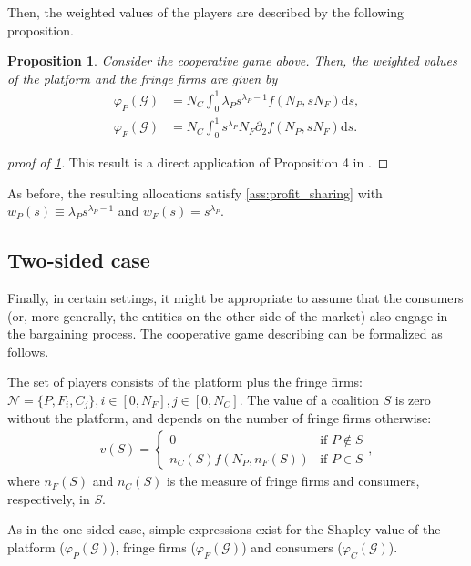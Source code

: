 \documentclass[a4paper]{article}
\newtheorem{proposition}{Proposition}
\newcommand{\ds}{\mathrm{d}s}
\begin{document}
Then, the weighted values of the players are described by the following proposition.

\begin{proposition}
    \label{prop:profit_sharing_weighted}
    Consider the cooperative game above.
    Then, the weighted values of the platform and the fringe firms are given by
    \begin{align*}
        \varphi_P(\mathcal{G}) &= N_C \int_0^1 \lambda_P s ^ {\lambda_P - 1} f(N_P, s N_F) \ds, \\
        \varphi_F(\mathcal{G}) &= N_C \int_0^1 s ^ {\lambda_P} N_F \partial_2 f(N_P, s N_F) \ds.
    \end{align*}
\end{proposition}

\begin{proof}[proof of \cref{prop:profit_sharing_weighted}]
    This result is a direct application of Proposition 4 in \textcite{stancsics2023value}.
\end{proof}

As before, the resulting allocations satisfy \cref{ass:profit_sharing} with $w_P(s) \equiv \lambda_P s ^ {\lambda_P - 1}$ and $w_F(s) = s ^ {\lambda_P}$.


\subsection{Two-sided case}
\label{sec:cooperative_game_two_sided}

Finally, in certain settings, it might be appropriate to assume that the consumers (or, more generally, the entities on the other side of the market) also engage in the bargaining process.
The cooperative game describing can be formalized as follows.

The set of players consists of the platform plus the fringe firms: $\mathcal{N} = \{P, F_i, C_j\}, i \in [0, N_F], j \in [0, N_C]$.
The value of a coalition $S$ is zero without the platform, and depends on the number of fringe firms otherwise:
\begin{align*}
    v(S) = \begin{cases}
        0 & \text{if } P \notin S \\
        n_C(S) f(N_P, n_F(S)) & \text{if } P \in S
    \end{cases},
\end{align*}
where $n_F(S)$ and $n_C(S)$ is the measure of fringe firms and consumers, respectively, in $S$.

As in the one-sided case, simple expressions exist for the Shapley value of the platform ($\varphi_P(\mathcal{G})$), fringe firms ($\varphi_F(\mathcal{G})$) and consumers ($\varphi_C(\mathcal{G})$).
\end{document}
